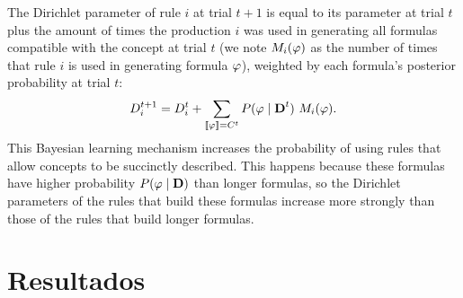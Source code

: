 The Dirichlet parameter of rule $i$ at trial $t+1$ is equal to its parameter at trial $t$ plus the amount of times the production $i$ was used in generating all formulas compatible with the concept at trial $t$ (we note $M_{i}(\varphi)$ as the number of times that rule $i$ is used in generating formula $\varphi$), weighted by each formula's posterior probability at trial $t$:
 \begin{equation}
 D_{i}^{t+1}=D_{i}^{t}+\sum_{\llbracket \varphi\rrbracket=C^t} P(\varphi\mid \textbf{D}^{t}) \ M_{i}(\varphi).
 \label{Dirichlet}
 \end{equation}
This Bayesian learning mechanism increases the probability of using rules that allow concepts to be succinctly described. This happens because these formulas have higher probability $P(\varphi\mid \textbf{D})$ than longer formulas, so the Dirichlet parameters of the rules that build these formulas increase more strongly than those of the rules that build longer formulas.   

\section{Resultados}

